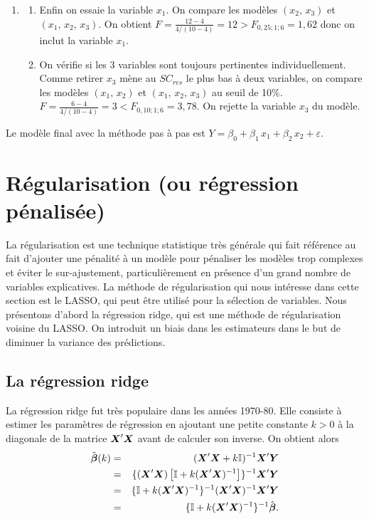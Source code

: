 \begin{exemple}
\begin{enumerate}
    \item
        \begin{enumerate}[$\bullet$]
        \item Enfin on essaie la variable $x_1$. On compare les modèles $(x_2,\,x_3)$ et $(x_1,\,x_2,\,x_3)$. On obtient $F=\frac{12-4}{4/(10-4)}=12>F_{0,25;1;6}=1,62$ donc on inclut la variable $x_1$.
        \item On vérifie si les 3 variables  sont toujours pertinentes individuellement. Comme retirer $x_3$ mène au $SC_{res}$ le plus bas à deux variables, on compare les modèles $(x_1,\,x_2)$ et $(x_1,\,x_2,\,x_3)$ au seuil de 10\%. $F=\frac{6-4}{4/(10-4)}=3 < F_{0,10;1;6}=3,78$. On rejette la variable $x_3$ du modèle.
        \end{enumerate}

    \end{enumerate}
    Le modèle final avec la méthode pas à pas est $Y=\beta_0+\beta_1\,x_1+\beta_2\,x_2+\varepsilon$.
\end{exemple}

\newpage
\section{Régularisation (ou régression pénalisée)}

La régularisation est une technique statistique très générale qui fait référence au fait d'ajouter une pénalité à un modèle pour pénaliser les modèles trop complexes et éviter le sur-ajustement, particulièrement en présence d'un grand nombre de variables explicatives. La méthode de régularisation qui nous intéresse dans cette section est le LASSO, qui peut être utilisé pour la sélection de variables. Nous présentons d'abord la régression ridge, qui est une méthode de régularisation voisine du LASSO. On introduit un biais dans les estimateurs dans le but de diminuer la variance des prédictions.

\subsection{La régression \og ridge \fg}
\label{sec:ridge}

La régression ridge fut très populaire dans les années 1970-80. Elle consiste à estimer les paramètres de régression en ajoutant une petite constante $k>0$ à la diagonale de la matrice $\mbox{\boldmath$X$\unboldmath}'\mbox{\boldmath$X$\unboldmath}$ avant de calculer son inverse. %
On obtient alors
\begin{eqnarray*}
\hat{\mbox{\boldmath$\beta$}}(k) & = & (\mbox{\boldmath$X$\unboldmath}'\mbox{\boldmath$X$\unboldmath}+k\mbox{\boldmath$\mathbb{I}$\unboldmath})^{-1}\mbox{\boldmath$X$\unboldmath}'\mbox{\boldmath$Y$\unboldmath}  \\
& = & \{(\mbox{\boldmath$X$\unboldmath}'\mbox{\boldmath$X$\unboldmath})\left[\mbox{\boldmath$\mathbb{I}$\unboldmath}+k(\mbox{\boldmath$X$\unboldmath}'\mbox{\boldmath$X$\unboldmath})^{-1}\right]\}^{-1}\mbox{\boldmath$X$\unboldmath}'\mbox{\boldmath$Y$\unboldmath}  \\
& = & \{\mbox{\boldmath$\mathbb{I}$\unboldmath}+k(\mbox{\boldmath$X$\unboldmath}'\mbox{\boldmath$X$\unboldmath})^{-1}\}^{-1}(\mbox{\boldmath$X$\unboldmath}'\mbox{\boldmath$X$\unboldmath})^{-1}\mbox{\boldmath$X$\unboldmath}'\mbox{\boldmath$Y$\unboldmath} \\
& = & \{\mbox{\boldmath$\mathbb{I}$\unboldmath}+k(\mbox{\boldmath$X$\unboldmath}'\mbox{\boldmath$X$\unboldmath})^{-1}\}^{-1}\hat{\mbox{\boldmath$\beta$}}.
\end{eqnarray*}

